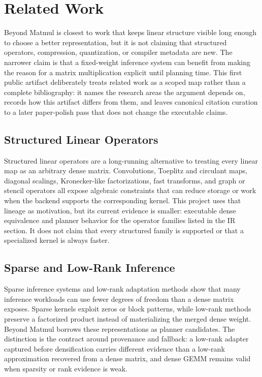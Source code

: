 \documentclass[11pt]{article}
\begin{document}
\section{Related Work}

Beyond Matmul is closest to work that keeps linear structure visible long
enough to choose a better representation, but it is not claiming that
structured operators, compression, quantization, or compiler metadata are new.
The narrower claim is that a fixed-weight inference system can benefit from
making the reason for a matrix multiplication explicit until planning time.
This first public artifact deliberately treats related work as a scoped map
rather than a complete bibliography: it names the research areas the argument
depends on, records how this artifact differs from them, and leaves canonical
citation curation to a later paper-polish pass that does not change the
executable claims.

\subsection{Structured Linear Operators}

Structured linear operators are a long-running alternative to treating every
linear map as an arbitrary dense matrix. Convolutions, Toeplitz and circulant
maps, diagonal scalings, Kronecker-like factorizations, fast transforms, and
graph or stencil operators all expose algebraic constraints that can reduce
storage or work when the backend supports the corresponding kernel.
This project uses that lineage as motivation, but its current evidence is
smaller: executable dense
equivalence and planner behavior for the operator families listed in the IR
section. It does not claim that every structured family is supported or that a
specialized kernel is always faster.

\subsection{Sparse and Low-Rank Inference}

Sparse inference systems and low-rank adaptation methods show that many
inference workloads can use fewer degrees of freedom than a dense matrix
exposes. Sparse kernels exploit zeros or block patterns, while low-rank
methods preserve a factorized product instead of materializing the merged
dense weight. Beyond Matmul borrows these representations as planner
candidates. The distinction is the contract around provenance and fallback: a
low-rank adapter captured before
densification carries different evidence than a low-rank approximation
recovered from a dense matrix, and dense GEMM remains valid when sparsity or
rank evidence is weak.
\end{document}
